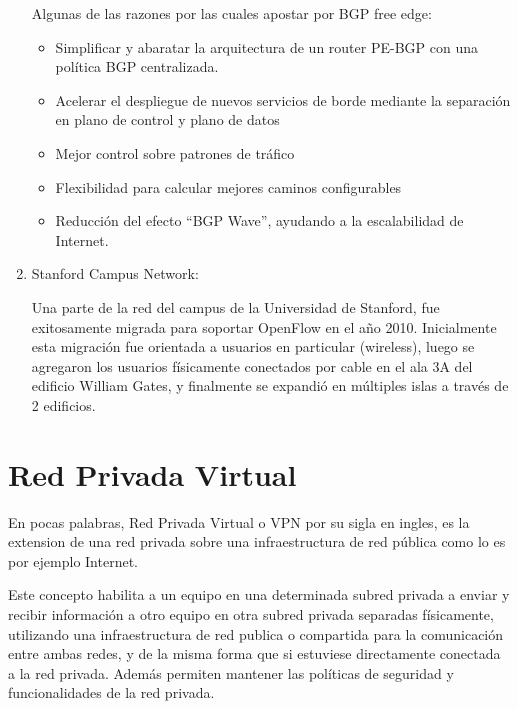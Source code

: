 \begin{enumerate}
Algunas de las razones por las cuales apostar por BGP free edge:
\begin{itemize}
\item Simplificar y abaratar la arquitectura de un router PE-BGP con una política BGP centralizada.
\item Acelerar el despliegue de nuevos servicios de borde mediante la separación en plano de control y plano de datos
\item Mejor control sobre patrones de tráfico
\item Flexibilidad para calcular mejores caminos configurables
\item Reducción del efecto ``BGP Wave'', ayudando a la escalabilidad de Internet.
\end{itemize}

\item Stanford Campus Network:

Una parte de la red del campus de la Universidad de Stanford, fue exitosamente migrada para soportar OpenFlow en el año 2010.
Inicialmente esta migración fue orientada a usuarios en particular (wireless), luego se agregaron los usuarios físicamente conectados por cable en el ala 3A del edificio William Gates, y finalmente se expandió en múltiples islas a través de 2 edificios.

\end{enumerate}

\section{Red Privada Virtual}
\label{section2.7}

En pocas palabras, Red Privada Virtual o VPN por su sigla en ingles, es la extension de una red privada sobre una infraestructura de red p\'ublica como lo es por ejemplo Internet.

Este concepto habilita a un equipo en una determinada subred privada a enviar y recibir información a otro equipo en otra subred privada separadas f\'isicamente, utilizando una infraestructura de red publica o compartida para la comunicaci\'on entre ambas redes, y de la misma forma que si estuviese directamente conectada a la red privada. Adem\'as permiten mantener las políticas de seguridad y funcionalidades de la red privada.\\


